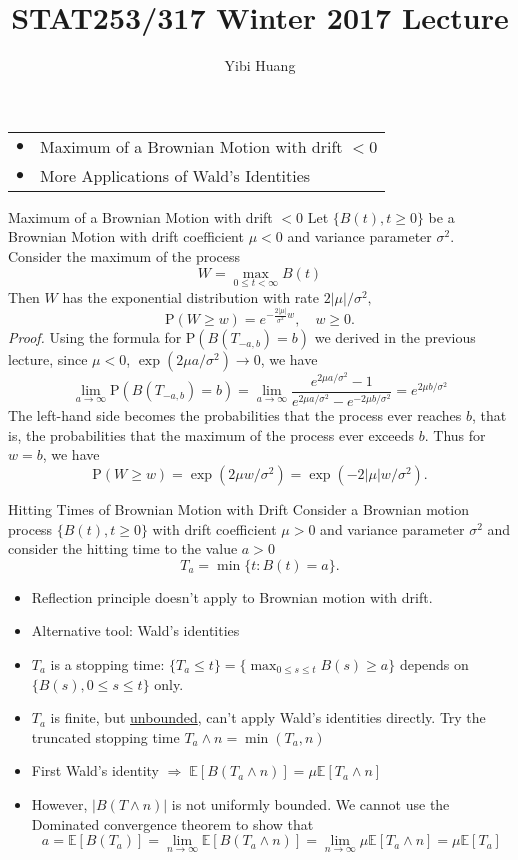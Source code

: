 \documentclass[letterpaper,handout]{beamer}
\title{STAT253/317 Winter 2017 Lecture \chapnum} \date{} \author{Yibi Huang}
\def\p{\mathrm P}
\def\E{\mathbb E}
\begin{document}
\begin{frame}\maketitle
\bigskip
\begin{center}\large
\begin{tabular}{ll}
$\bullet$ & Maximum of a Brownian Motion with drift $<0$\\
$\bullet$ & More Applications of Wald's Identities
\end{tabular}
\end{center}
\end{frame}
\begin{frame}{Maximum of a Brownian Motion with drift $<0$}
Let $\{B(t),t\ge 0\}$ be a Brownian Motion with drift coefficient $\mu < 0$ and variance parameter $\sigma^2$. Consider the maximum of the process
$$W=\max_{0\le t<\infty} B(t)$$
Then $W$ has the exponential distribution with rate $2|\mu|/\sigma^2,$
$$\p(W\ge w)=e^{-\frac{2|\mu|}{\sigma^2} w},\quad w\ge 0.$$
{\em Proof.} Using the formula for $\p(B(T_{-a,b})=b)$ we derived in the previous lecture, since $\mu<0$, $\exp(2\mu a/\sigma^2)\to 0$, we have
$$\lim_{a\to\infty}\p(B(T_{-a,b})=b)=\lim_{a\to\infty} \frac{e^{2\mu a/\sigma^2}-1}{e^{2\mu a/\sigma^2}-e^{-2\mu b/\sigma^2}}=e^{2\mu b/\sigma^2}$$
The left-hand side becomes the probabilities that the process ever reaches $b$, that is, the probabilities that the maximum of the process ever exceeds $b$. Thus for $w=b$, we have
$$\p(W\ge w)=\exp(2\mu w/\sigma^2)=\exp(-2|\mu| w/\sigma^2).$$
\end{frame}
\begin{frame}{Hitting Times of Brownian Motion with Drift}
Consider a Brownian motion process $\{B(t), t \ge 0\}$ with drift coefficient $\mu>0$ and variance
parameter $\sigma^2$ and consider the hitting time to the value $a>0$
$$T_a=\min\{t: B(t)=a\}.$$\vspace{-15pt}

\begin{itemize}\itemsep=3pt
\item Reflection principle doesn't apply to Brownian motion with drift.
\item Alternative tool: Wald's identities
\item $T_a$ is a stopping time: $\{T_a\le t\}=\{\max_{0\le s\le t}B(s)\ge a\}$ depends on $\{B(s),0\le s\le t\}$ only.
\item $T_a$ is finite, but \underline{unbounded}, can't apply Wald's identities directly. Try the truncated stopping time $T_a\wedge n=\min(T_a,n)$
\item First Wald's identity $\Rightarrow\;\E[B(T_a\wedge n)]=\mu\E[T_a\wedge n]$
\item However, $|B(T\wedge n)|$ is not uniformly bounded. We cannot use the Dominated convergence theorem to show that
    $$a =\E[B(T_a)]=\lim_{n\to\infty}\E[B(T_a\wedge n)]=\lim_{n\to\infty}\mu\E[T_a\wedge n]=\mu\E[T_a]$$
\end{itemize}
\end{frame}
\end{document}
